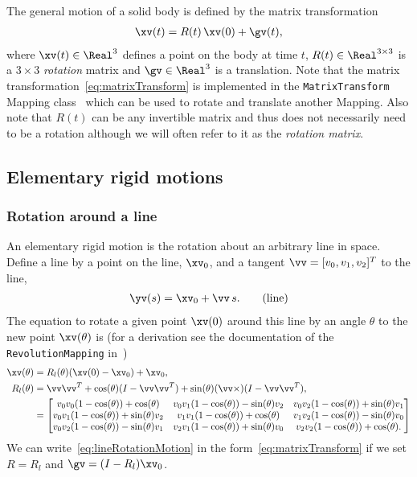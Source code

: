 The general motion of a solid body is defined by the matrix transformation
\begin{align}
  \xv(t) = R(t)\, \xv(0) + \gv(t),   \label{eq:matrixTransform}
\end{align}
where $\xv (t)\in \Real^3$ defines a point on the body at time $t$, 
$R(t)\in \Real^{3\times3}$ is a $3\times3$ {\em rotation} matrix and
$\gv\in\Real^3$ is a translation. Note that the matrix transformation~\eqref{eq:matrixTransform} is
implemented in the {\tt MatrixTransform} Mapping class~\cite{MAPPINGS} which can be used to rotate
and translate another Mapping. Also note that $R(t)$ can be any invertible matrix and thus does not
necessarily need to be a rotation although we will often refer to it as the {\em rotation matrix}.


\subsection{Elementary rigid motions}

\newcommand{\ct}{\cos(\theta)}
\newcommand{\st}{\sin(\theta)}
\subsubsection{Rotation around a line}
An elementary rigid motion is the rotation about an arbitrary line in space. Define a line by a point
on the line, $\xv_0$, and a tangent $\vv=[v_0, v_1, v_2]^T$ to the line,
\begin{align}
  \yv(s) = \xv_0 + \vv\, s  . \qquad\text{(line)}
\end{align}
The equation to rotate a given point $\xv(0)$ around this line by an angle $\theta$ to the
new point $\xv(\theta)$ is (for a derivation see the documentation of the {\tt RevolutionMapping} in~\cite{MAPPINGS}) 
\begin{align}
  \xv (\theta) &= R_l(\theta) (\xv(0)-\xv_0) + \xv_0,  \label{eq:lineRotationMotion} \\
   R_l(\theta) &= \vv \vv^T + \cos(\theta) ( I -\vv \vv^T ) + \sin(\theta) ( \vv \times )(  I -\vv \vv^T),\\
      &= \begin{bmatrix}
             v_0 v_0 (1-\ct)+\ct      &  v_0 v_1 (1-\ct)-\st v_2  & v_0 v_2 (1-\ct)+\st v_1  \\
             v_0 v_1 (1-\ct)+\st v_2  &  v_1 v_1 (1-\ct)+\ct      & v_1 v_2 (1-\ct)-\st v_0  \\
             v_0 v_2 (1-\ct)-\st v_1  &  v_2 v_1 (1-\ct)+\st v_0  & v_2 v_2 (1-\ct)+\ct   .  
         \end{bmatrix}
\end{align}
We can write~\eqref{eq:lineRotationMotion} in the form~\eqref{eq:matrixTransform} if we set
$R=R_l$ and $\gv = (I-R_l)\xv_0$.


